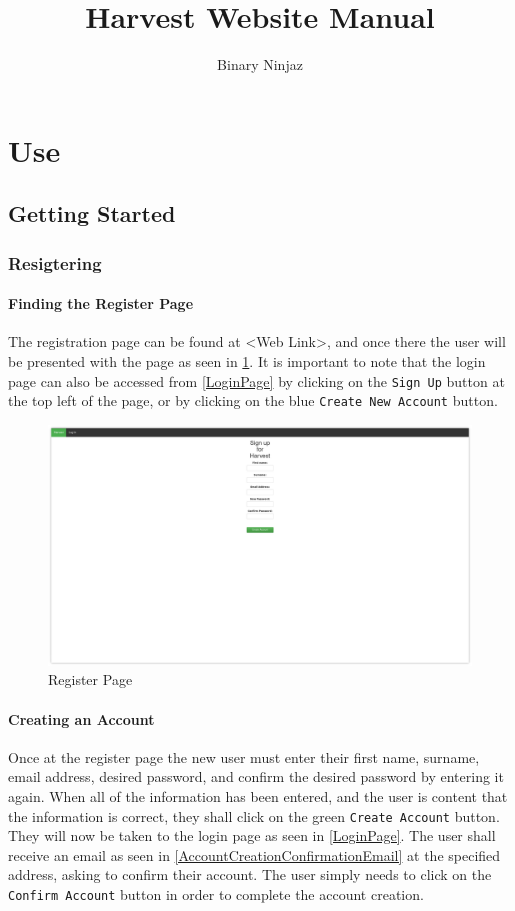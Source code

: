 \documentclass[a4paper,10pt,titlepage]{article}
\author{Binary Ninjaz}
\title{Harvest Website Manual}
\date{}
\begin{document}
\maketitle
{}
\tableofcontents
\newpage
\listoffigures
\newpage
{}
\section{Use}
\subsection{Getting Started}
\subsubsection{Resigtering}
\paragraph{Finding the Register Page}The registration page can be found at <Web Link>, and once there the user will be presented with the page as seen in \ref{RegisterPage}. It is important to note that the login page can also be accessed from \ref{LoginPage} by clicking on the \texttt{Sign Up} button at the top left of the page, or by clicking on the blue \texttt{Create New Account} button.

\begin{figure}
 \centering
 \includegraphics[width=12cm, keepaspectratio]{Images/Register-Page.png}
 \caption{Register Page}
 \label{RegisterPage}
\end{figure}

\paragraph{Creating an Account}Once at the register page the new user must enter their first name, surname, email address, desired password, and confirm the desired password by entering it again. When all of the information has been entered, and the user is content that the information is correct, they shall click on the green \texttt{Create Account} button. They will now be taken to the login page as seen in \ref{LoginPage}. The user shall receive an email as seen in \ref{AccountCreationConfirmationEmail} at the specified address, asking to confirm their account. The user simply needs to click on the \texttt{Confirm Account} button in order to complete the account creation.
\end{document}
